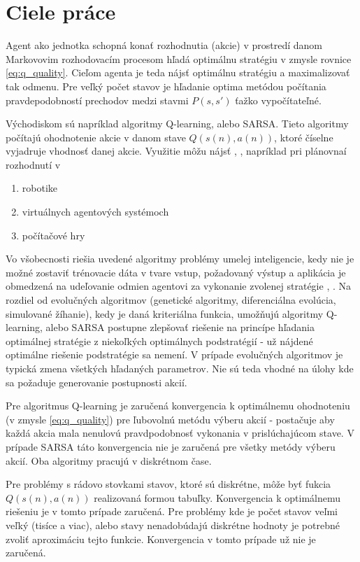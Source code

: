 \chapter{Ciele práce}

Agent ako jednotka schopná konať rozhodnutia (akcie) v prostredí danom Markovovim \cite{bib:markov_02}
rozhodovacím procesom hľadá optimálnu stratégiu v zmysle rovnice \ref{eq:q_quality}.
Cieľom agenta je teda nájsť optimálnu stratégiu a maximalizovať tak odmenu.
Pre veľký počet stavov je hľadanie optima metódou počítania
pravdepodobností prechodov medzi stavmi $P(s, s')$ ťažko vypočítateľné.

Východiskom sú napríklad algoritmy Q-learning, alebo SARSA. Tieto algoritmy počítajú
ohodnotenie akcie v danom stave $Q(s(n), a(n))$, ktoré číselne vyjadruje vhodnosť
danej akcie. Využitie môžu nájsť \cite{bib:q_app_01}, \cite{bib:q_app_02}, \cite{bib:q_app_03} napríklad pri plánovnaí rozhodnutí v
\begin{enumerate}
  \item robotike
  \item virtuálnych agentových systémoch
  \item počítačové hry
\end{enumerate}

Vo všobecnosti riešia uvedené algoritmy problémy umelej inteligencie, kedy
nie je možné zostaviť trénovacie dáta v tvare vstup, požadovaný výstup a aplikácia
je obmedzená na udeľovanie odmien agentovi za vykonanie zvolenej stratégie
\cite{bib:reinforcement_leraning_01}, \cite{bib:reinforcement_leraning_02}. Na rozdiel
od evolučných algoritmov (genetické algoritmy, diferenciálna evolúcia, simulované žíhanie),
kedy je daná kriteriálna funkcia, umožňujú algoritmy Q-learning, alebo SARSA
postupne zlepšovať riešenie na princípe hľadania optimálnej stratégie z niekoľkých
optimálnych podstratégií - už nájdené optimálne riešenie podstratégie sa nemení. V prípade evolučných
algoritmov je typická zmena všetkých hľadaných parametrov. Nie sú teda vhodné
na úlohy kde sa požaduje generovanie postupnosti akcií.

Pre algoritmus Q-learning je zaručená konvergencia k optimálnemu
ohodnoteniu (v zmysle \ref{eq:q_quality}) \cite{bib:q_conv_proof}
pre ľubovolnú metódu výberu
akcií - postačuje aby každá akcia mala nenulovú pravdpodobnosť vykonania v prislúchajúcom
stave. V prípade SARSA táto konvergencia nie je zaručená pre všetky metódy výberu akcií.
Oba algoritmy pracujú v diskrétnom čase.

Pre problémy s rádovo stovkami stavov, ktoré sú diskrétne, môže byť fukcia $Q(s(n), a(n))$ realizovaná
formou tabuľky. Konvergencia k optimálnemu riešeniu je v tomto prípade zaručená.
Pre problémy kde je počet stavov veľmi veľký (tisíce a viac), alebo stavy nenadobúdajú
diskrétne hodnoty je potrebné zvoliť aproximáciu tejto funkcie. Konvergencia v tomto
prípade už nie je zaručená.


